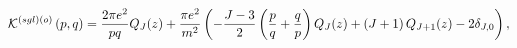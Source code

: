 \begin{equation}
\mathcal{K}^{\left( sgl\right) \left( o\right) }\left( p,q\right) =\frac{%
2\pi e^{2}}{pq}Q_{J}(z)+\frac{\pi e^{2}}{m^{2}}\left( -\frac{J-3}{2}\left( 
\frac{p}{q}+\frac{q}{p}\right) Q_{J}(z)+\left( J+1\right) Q_{J+1}(z)-2\delta
_{J,0}\right) ,
\end{equation}


